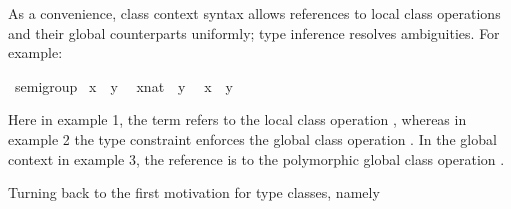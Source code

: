 \begin{isabellebody}
\begin{isamarkuptext}
\end{isamarkuptext}%
\isamarkuptrue%
%
\isamarkuptrue%
%
\begin{isamarkuptext}%
As a convenience, class context syntax allows references to local
  class operations and their global counterparts uniformly; type
  inference resolves ambiguities.  For example:%
\end{isamarkuptext}%
\isamarkuptrue%
%
\isadelimquote
%
\endisadelimquote
%
\isatagquote
{}\isamarkupfalse%
\ semigroup\isanewline
{}\isanewline
\isanewline
{}\isamarkupfalse%
\ {}x\ {}\ y{}\ %
\isanewline
{}\isamarkupfalse%
\ {}{}x{}nat{}\ {}\ y{}\ %
\isanewline
\isanewline
{}\isamarkupfalse%
\isanewline
\isanewline
{}\isamarkupfalse%
\ {}x\ {}\ y{}\ %
%
\endisatagquote
{\isafoldquote}%
%
\isadelimquote
%
\endisadelimquote
%
\begin{isamarkuptext}%
\noindent Here in example 1, the term refers to the local class
  operation , whereas in example 2 the type
  constraint enforces the global class operation .
  In the global context in example 3, the reference is to the
  polymorphic global class operation .%
\end{isamarkuptext}%
\isamarkuptrue%
%
\isamarkuptrue%
%
\isamarkuptrue%
%
\begin{isamarkuptext}%
Turning back to the first motivation for type classes, namely

\end{isamarkuptext}
\end{isabellebody}
